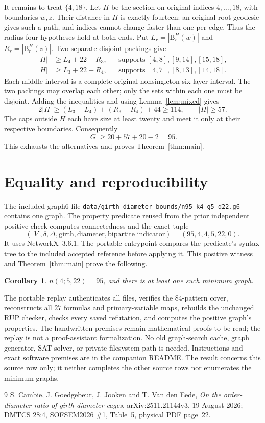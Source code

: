 \documentclass[11pt]{article}
\newtheorem{corollary}[theorem]{Corollary}
\newcommand{\B}{\mathrm B}
\newcommand{\note}[1]{\nolinkurl{#1}}
\begin{document}
It remains to treat $\{4,18\}$. Let $H$ be the section on original
indices $4,\ldots,18$, with boundaries $w,z$. Their distance in $H$ is
exactly fourteen: an original root geodesic gives such a path, and
indices cannot change faster than one per edge. Thus the radius-four
hypotheses hold at both ends. Put $L_r=|\B_r^H(w)|$ and
$R_r=|\B_r^H(z)|$. Two separate disjoint packings give
\begin{align*}
 |H|&\geq L_4+22+R_3,
 &&\text{supports }[4,8],[9,14],[15,18],\\
 |H|&\geq L_3+22+R_4,
 &&\text{supports }[4,7],[8,13],[14,18].
\end{align*}
Each middle interval is a complete original nonsingleton six-layer
interval. The two packings may overlap each other; only the sets
within each one must be disjoint. Adding the inequalities and using
Lemma~\ref{lem:mixed} gives
\[
 2|H|\geq(L_3+L_4)+(R_3+R_4)+44\geq114,
 \qquad |H|\geq57.
\]
The caps outside $H$ each have size at least twenty and meet it only
at their respective boundaries. Consequently
\[
 |G|\geq20+57+20-2=95.
\]
This exhausts the alternatives and proves Theorem~\ref{thm:main}.

\section{Equality and reproducibility}

The included graph6 file
\note{data/girth_diameter_bounds/n95_k4_g5_d22.g6} contains one graph.
The property predicate reused from the prior independent positive check
computes connectedness and the exact tuple
\[
 (|V|,\delta,\Delta,\text{girth},\text{diameter},
   \text{bipartite indicator})=(95,4,4,5,22,0).
\]
It uses NetworkX~3.6.1. The portable entrypoint compares the predicate's
syntax tree to the included accepted reference before applying it.
This positive witness and Theorem~\ref{thm:main} prove the following.
\begin{corollary}
$n(4;5,22)=95$, and there is at least one such minimum graph.
\end{corollary}

The portable replay authenticates all files, verifies the $84$-pattern
cover, reconstructs all $27$ formulas and primary-variable maps, rebuilds
the unchanged RUP checker, checks every saved refutation, and computes
the positive graph's properties. The handwritten premises remain
mathematical proofs to be read; the replay is not a proof-assistant
formalization. No old graph-search cache, graph generator, SAT solver,
or private filesystem path is needed. Instructions and exact software
premises are in the companion README. The result concerns this source
row only; it neither completes the other source rows nor enumerates the
minimum graphs.

\begin{thebibliography}{9}
 S. Cambie, J. Goedgebeur, J. Jooken and T. Van den Eede,
\emph{On the order-diameter ratio of girth-diameter cages},
arXiv:2511.21144v3, 19 August 2026; DMTCS 28:4, SOFSEM2026 \#1,
Table~5, physical PDF page~22.
\end{thebibliography}
\end{document}
